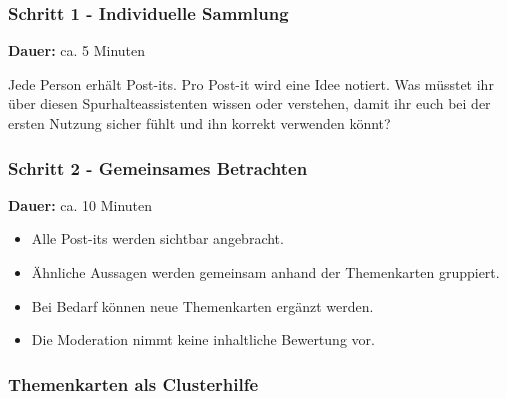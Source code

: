 \subsubsection*{Schritt 1 - Individuelle Sammlung}

\noindent
\textbf{Dauer:} ca. 5 Minuten

Jede Person erhält Post-its. Pro Post-it wird eine Idee notiert. Was müsstet ihr über diesen Spurhalteassistenten wissen oder verstehen, damit ihr euch bei der ersten Nutzung sicher fühlt und ihn korrekt verwenden könnt?

\subsubsection*{Schritt 2 - Gemeinsames Betrachten}

\noindent
\textbf{Dauer:} ca. 10 Minuten

\begin{itemize}
    \item Alle Post-its werden sichtbar angebracht.
    \item Ähnliche Aussagen werden gemeinsam anhand der Themenkarten gruppiert.
    \item Bei Bedarf können neue Themenkarten ergänzt werden.
    \item Die Moderation nimmt keine inhaltliche Bewertung vor.
\end{itemize}

\subsubsection*{Themenkarten als Clusterhilfe}

